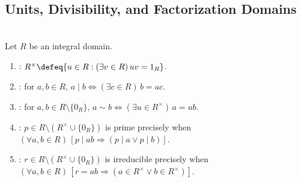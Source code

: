 \subsection{Units, Divisibility, and Factorization Domains}

\begin{definition} \label{def:unit-associate-prime-irreducible-domain} \\
Let $R$ be an integral domain.
\begin{enumerate}[label=(\roman*)]
\setlength{\itemsep}{0pt}
\item {}: $R^\times\defeq\{u\in R:(\exists v\in R)\,uv=1_R\}$.
\item {}: for $a,b\in R$, $a\mid b\Longleftrightarrow(\exists c\in R)\,b=ac$.
\item {}: for $a,b\in R\setminus\{0_R\}$, $a\sim b\Longleftrightarrow(\exists u\in R^\times)\,a=ub$.
\item {}: $p\in R\setminus(R^\times\cup\{0_R\})$ is prime precisely when $(\forall a,b\in R)\,[p\mid ab\Rightarrow(p\mid a\lor p\mid b)]$.
\item {}: $r\in R\setminus(R^\times\cup\{0_R\})$ is irreducible precisely when $(\forall a,b\in R)\,[r=ab\Rightarrow(a\in R^\times\lor b\in R^\times)]$.
\end{enumerate}
\end{definition}

